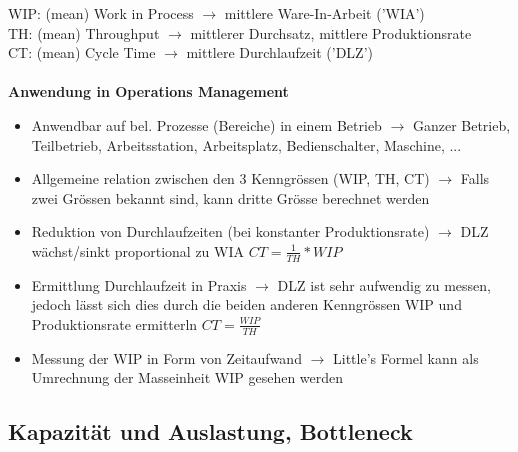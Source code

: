 \documentclass{report}
\theoremstyle{definition}
\theoremstyle{example}
\begin{document}
WIP: (mean) Work in Process $\rightarrow$ mittlere Ware-In-Arbeit ('WIA')\\
TH: (mean) Throughput $\rightarrow$ mittlerer Durchsatz, mittlere Produktionsrate\\
CT: (mean) Cycle Time $\rightarrow$ mittlere Durchlaufzeit ('DLZ')\\
\\
\textbf{Anwendung in Operations Management}\\
\begin{itemize}
   \item Anwendbar auf bel. Prozesse (Bereiche) in einem Betrieb $\rightarrow$ Ganzer Betrieb, Teilbetrieb, Arbeitsstation, Arbeitsplatz, Bedienschalter, Maschine, ...
   \item Allgemeine relation zwischen den 3 Kenngrössen (WIP, TH, CT) $\rightarrow$ Falls zwei Grössen bekannt sind, kann dritte Grösse berechnet werden
   \item Reduktion von Durchlaufzeiten (bei konstanter Produktionsrate) $\rightarrow$ DLZ wächst/sinkt proportional zu WIA $CT = \frac{1}{TH}* WIP$
   \item Ermittlung Durchlaufzeit in Praxis $\rightarrow$ DLZ ist sehr aufwendig zu messen, jedoch lässt sich dies durch die beiden anderen Kenngrössen WIP und Produktionsrate ermitterln $CT = \frac{WIP}{TH}$
   \item Messung der WIP in Form von Zeitaufwand $\rightarrow$ Little's Formel kann als Umrechnung der Masseinheit WIP gesehen werden
\end{itemize}

   \subsection{Kapazität und Auslastung, Bottleneck}
\end{document}
